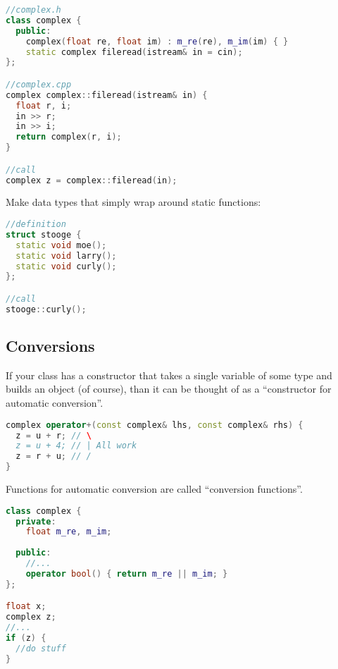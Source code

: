 \begin{lstlisting}[language=C++]
//complex.h
class complex {
  public:
    complex(float re, float im) : m_re(re), m_im(im) { }
    static complex fileread(istream& in = cin);
}; 

//complex.cpp
complex complex::fileread(istream& in) {
  float r, i;
  in >> r;
  in >> i;
  return complex(r, i);
}

//call
complex z = complex::fileread(in);
\end{lstlisting}

Make data types that simply wrap around static functions:

\begin{lstlisting}[language=C++]
//definition
struct stooge {
  static void moe();
  static void larry();
  static void curly();
};

//call
stooge::curly();
\end{lstlisting}


\subsection{Conversions}

If your class has a constructor that takes a single variable of some type and builds an object (of course), than it can be thought of as a ``constructor for automatic conversion''. 

\begin{lstlisting}[language=C++]
complex operator+(const complex& lhs, const complex& rhs) {
  z = u + r; // \
  z = u + 4; // | All work
  z = r + u; // /
}
\end{lstlisting}

Functions for automatic conversion are called ``conversion functions''.

\begin{lstlisting}[language=C++]
class complex {
  private:
    float m_re, m_im;
  
  public:
    //...
    operator bool() { return m_re || m_im; }
};

float x;
complex z;
//...
if (z) {
  //do stuff
}
\end{lstlisting}
